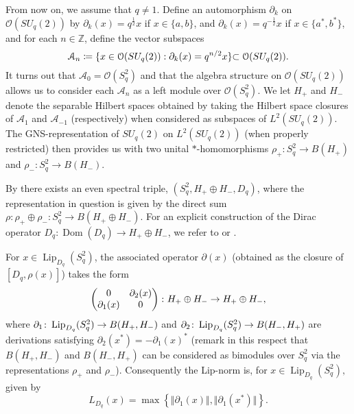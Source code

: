 \documentclass[11pt, reqno, a4paper, final]{amsart}
\theoremstyle{plain}
\theoremstyle{definition}
\newcommand{\ZZ}{{\mathbb Z}}
\newcommand{\Dom}{\operatorname{Dom}}
\newcommand{\Lip}{\operatorname{Lip}}
\newcommand{\black}{\color{black}}
\begin{document}
{\black From now on, we assume that $q \neq 1$.} Define an automorphism $\partial_k$ on $\mathcal{O}(SU_q(2))$ by $\partial_k(x)=q^{\frac{1}{2}}x$ if $x\in\lbrace a,b\rbrace$, and $\partial_k(x)=q^{-\frac{1}{2}}x$ if $x\in\lbrace a^*,b^*\rbrace$, and for each $n\in \ZZ$, define the vector {\black subspaces} $$\mathcal{A}_n\coloneqq \lbrace x\in \mathcal{O}(SU_q(2)) : \partial_k(x)=q^{n/2}x\rbrace {\black \subset \mathcal{O}(SU_q(2)).}$$ {\black It turns out that $\mathcal{A}_0 = \mathcal{O}(S_q^2)$ and that the algebra structure on $\mathcal{O}(SU_q(2))$ allows us to consider each $\mathcal{A}_n$ as a left module over $\mathcal{O}(S_q^2)$.} {\black We let $H_+$ and $H_-$ denote the separable Hilbert spaces obtained by taking the Hilbert space closures of $\mathcal{A}_1$ and $\mathcal{A}_{-1}$ (respectively) when considered as subspaces of $L^2(SU_q(2))$. The GNS-representation of $SU_q(2)$ on $L^2(SU_q(2))$ (when properly restricted) then provides us with two unital $*$-homomorphisms $\rho_+ : S_q^2 \to B(H_+)$ and $\rho_- : S_q^2 \to B(H_-)$.} %

By \cite{Dabrowski-Sitarz} there exists an even spectral triple, {\black  $(S_q^2,H_+ \oplus H_-,D_q)$, where the representation in question is given by the direct sum $\rho : \rho_+ \oplus \rho_- : S_q^2 \to B(H_+ \oplus H_-)$. For an explicit construction of the Dirac operator $D_q : \Dom(D_q) \to H_+ \oplus H_-$, we refer to \cite{Dabrowski-Sitarz,Neshveyev-Tuset} or \cite{Kaad-Aguilar}.} 

For $x\in \Lip_{D_q}(S_q^2)$, the associated {\black operator $\partial(x)$ (obtained as the closure of $[D_q,\rho(x)]$)} takes the form
\[
\begin{pmatrix}
 0 & \partial_2(x)
 \\
 \partial_1(x) & 0 
 \end{pmatrix}\colon {\black H_+\oplus H_-\to H_+\oplus H_-,}
\]
where $\partial_1\colon \Lip_{D_q}(S_q^2)\to {\black B(H_+,H_-)}$ and $\partial_2\colon \Lip_{D_q}(S_q^2)\to {\black B(H_-, H_+)}$ are derivations satisfying $\partial_2(x^*)=-\partial_1(x)^*$ {\black (remark in this respect that $B(H_+,H_-)$ and $B(H_-,H_+)$ can be considered as bimodules over $S_q^2$ via the representations $\rho_+$ and $\rho_-$)}. Consequently the Lip-norm is, for $x\in \Lip_{D_q}(S_q^2),$ given by
\[
L_{D_q}(x)= \max \left\lbrace\Vert \partial_1(x)\Vert, \Vert \partial_1(x^*)\Vert \right\rbrace.
\]
  
\end{document}
